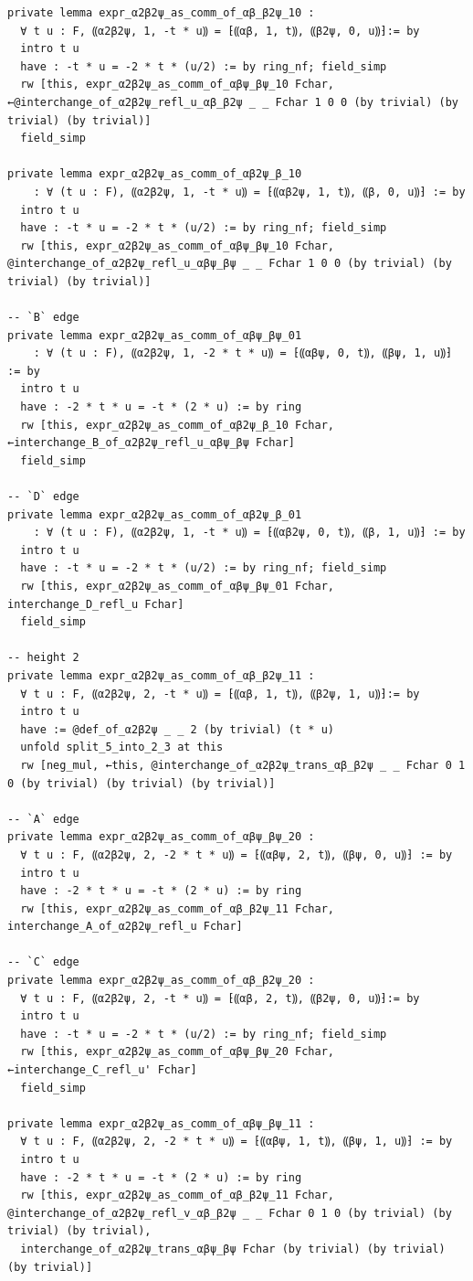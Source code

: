 \documentclass[10pt,a4paper]{article}
\begin{document}
\begin{Verbatim}
private lemma expr_α2β2ψ_as_comm_of_αβ_β2ψ_10 :
  ∀ t u : F, ⸨α2β2ψ, 1, -t * u⸩ = ⁅⸨αβ, 1, t⸩, ⸨β2ψ, 0, u⸩⁆:= by
  intro t u
  have : -t * u = -2 * t * (u/2) := by ring_nf; field_simp
  rw [this, expr_α2β2ψ_as_comm_of_αβψ_βψ_10 Fchar, ←@interchange_of_α2β2ψ_refl_u_αβ_β2ψ _ _ Fchar 1 0 0 (by trivial) (by trivial) (by trivial)]
  field_simp

private lemma expr_α2β2ψ_as_comm_of_αβ2ψ_β_10
    : ∀ (t u : F), ⸨α2β2ψ, 1, -t * u⸩ = ⁅⸨αβ2ψ, 1, t⸩, ⸨β, 0, u⸩⁆ := by
  intro t u
  have : -t * u = -2 * t * (u/2) := by ring_nf; field_simp
  rw [this, expr_α2β2ψ_as_comm_of_αβψ_βψ_10 Fchar, @interchange_of_α2β2ψ_refl_u_αβψ_βψ _ _ Fchar 1 0 0 (by trivial) (by trivial) (by trivial)]

-- `B` edge
private lemma expr_α2β2ψ_as_comm_of_αβψ_βψ_01
    : ∀ (t u : F), ⸨α2β2ψ, 1, -2 * t * u⸩ = ⁅⸨αβψ, 0, t⸩, ⸨βψ, 1, u⸩⁆ := by
  intro t u
  have : -2 * t * u = -t * (2 * u) := by ring
  rw [this, expr_α2β2ψ_as_comm_of_αβ2ψ_β_10 Fchar, ←interchange_B_of_α2β2ψ_refl_u_αβψ_βψ Fchar]
  field_simp

-- `D` edge
private lemma expr_α2β2ψ_as_comm_of_αβ2ψ_β_01
    : ∀ (t u : F), ⸨α2β2ψ, 1, -t * u⸩ = ⁅⸨αβ2ψ, 0, t⸩, ⸨β, 1, u⸩⁆ := by
  intro t u
  have : -t * u = -2 * t * (u/2) := by ring_nf; field_simp
  rw [this, expr_α2β2ψ_as_comm_of_αβψ_βψ_01 Fchar, interchange_D_refl_u Fchar]
  field_simp

-- height 2
private lemma expr_α2β2ψ_as_comm_of_αβ_β2ψ_11 :
  ∀ t u : F, ⸨α2β2ψ, 2, -t * u⸩ = ⁅⸨αβ, 1, t⸩, ⸨β2ψ, 1, u⸩⁆:= by
  intro t u
  have := @def_of_α2β2ψ _ _ 2 (by trivial) (t * u)
  unfold split_5_into_2_3 at this
  rw [neg_mul, ←this, @interchange_of_α2β2ψ_trans_αβ_β2ψ _ _ Fchar 0 1 0 (by trivial) (by trivial) (by trivial)]

-- `A` edge
private lemma expr_α2β2ψ_as_comm_of_αβψ_βψ_20 :
  ∀ t u : F, ⸨α2β2ψ, 2, -2 * t * u⸩ = ⁅⸨αβψ, 2, t⸩, ⸨βψ, 0, u⸩⁆ := by
  intro t u
  have : -2 * t * u = -t * (2 * u) := by ring
  rw [this, expr_α2β2ψ_as_comm_of_αβ_β2ψ_11 Fchar, interchange_A_of_α2β2ψ_refl_u Fchar]

-- `C` edge
private lemma expr_α2β2ψ_as_comm_of_αβ_β2ψ_20 :
  ∀ t u : F, ⸨α2β2ψ, 2, -t * u⸩ = ⁅⸨αβ, 2, t⸩, ⸨β2ψ, 0, u⸩⁆:= by
  intro t u
  have : -t * u = -2 * t * (u/2) := by ring_nf; field_simp
  rw [this, expr_α2β2ψ_as_comm_of_αβψ_βψ_20 Fchar, ←interchange_C_refl_u' Fchar]
  field_simp

private lemma expr_α2β2ψ_as_comm_of_αβψ_βψ_11 :
  ∀ t u : F, ⸨α2β2ψ, 2, -2 * t * u⸩ = ⁅⸨αβψ, 1, t⸩, ⸨βψ, 1, u⸩⁆ := by
  intro t u
  have : -2 * t * u = -t * (2 * u) := by ring
  rw [this, expr_α2β2ψ_as_comm_of_αβ_β2ψ_11 Fchar, @interchange_of_α2β2ψ_refl_v_αβ_β2ψ _ _ Fchar 0 1 0 (by trivial) (by trivial) (by trivial),
  interchange_of_α2β2ψ_trans_αβψ_βψ Fchar (by trivial) (by trivial) (by trivial)]


\end{Verbatim}
\end{document}
